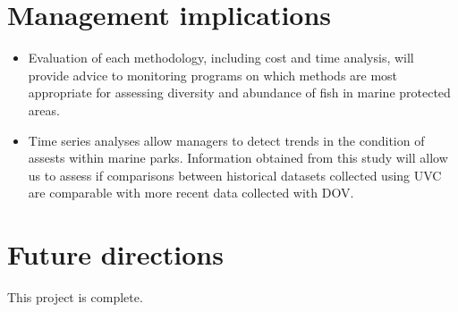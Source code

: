 \documentclass[version=last, paper=a4, DIV=18, usenames, dvipsnames]{scrartcl}
\begin{document}
\section{Management implications}



\begin{itemize}

  \item Evaluation of each methodology, including cost and time analysis, will provide advice to monitoring programs on which methods are most appropriate for assessing diversity and abundance of fish in marine protected areas.

  \item Time series analyses allow managers to detect trends in the condition of assests within marine parks. Information obtained from this study will allow us to assess if comparisons between historical datasets collected using UVC are comparable with more recent data collected with DOV.

\end{itemize}






\section{Future directions}



This project is complete.






\clearpage
\end{document}
